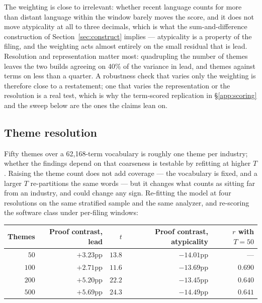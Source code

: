 \noindent The weighting is close to irrelevant: whether recent language counts
for more than distant language within the window barely moves the score, and it
does not move atypicality at all to three decimals, which is what the
sum-and-difference construction of Section~\ref{sec:construct} implies ---
atypicality is a property of the filing, and the weighting acts almost
entirely on the small residual that is lead. Resolution and representation matter
most: quadrupling the number of themes leaves the two builds agreeing on 40\%
of the variance in lead, and themes against terms on less than a quarter. A
robustness check that varies only the weighting is therefore close to a
restatement; one that varies the representation or the resolution is a real
test, which is why the term-scored replication in \S\ref{app:scoring}
and the sweep below are the ones the claims lean on.

\subsection{Theme resolution}

Fifty themes over a 62,168-term vocabulary is roughly one theme per
industry; whether the findings depend on that coarseness is testable by
refitting at higher $T$. Raising the theme count does not add coverage --- the
vocabulary is fixed, and a larger $T$ re-partitions the same words --- but it
changes what counts as sitting far from an industry, and could change any sign.
Re-fitting the model at four resolutions on the same stratified sample and the
same analyzer, and re-scoring the software class under per-filing windows:

\begin{center}\small
\begin{tabular}{rrrrr}
\toprule
Themes & Proof contrast, lead & $t$ & Proof contrast, atypicality & $r$ with $T=50$ \\
\midrule
$50$   & $+3.23$pp & $13.8$ & $-14.01$pp & --- \\
$100$  & $+2.71$pp & $11.6$ & $-13.69$pp & $0.690$ \\
$200$  & $+5.20$pp & $22.2$ & $-13.45$pp & $0.640$ \\
$500$  & $+5.69$pp & $24.3$ & $-14.49$pp & $0.641$ \\
\bottomrule
\end{tabular}
\end{center}

